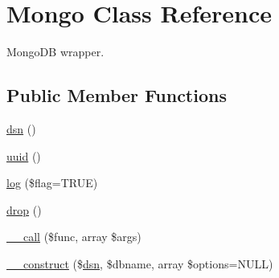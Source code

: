 \hypertarget{class_d_b_1_1_mongo}{}\section{Mongo Class Reference}
\label{class_d_b_1_1_mongo}


Mongo\+DB wrapper.  


\subsection*{Public Member Functions}
\begin{DoxyCompactItemize}
\item 
\hyperlink{class_d_b_1_1_mongo_af0196134b8f5405b3fe27fcceece0061}{dsn} ()
\item 
\hyperlink{class_d_b_1_1_mongo_a0a684acda95e124d8596758e4986fe44}{uuid} ()
\item 
\hyperlink{class_d_b_1_1_mongo_a92faa80a7077936bd630e5dcc7bb4a64}{log} (\$flag=T\+R\+UE)
\item 
\hyperlink{class_d_b_1_1_mongo_aeb639e5b2b713ed87ab8f2033af98ae8}{drop} ()
\item 
\hyperlink{class_d_b_1_1_mongo_a975d2c46a134129eb727fadcadf48adf}{\+\_\+\+\_\+call} (\$func, array \$args)
\item 
\hyperlink{class_d_b_1_1_mongo_ae0cc294ff45d4b98e4022efd3ae640d3}{\+\_\+\+\_\+construct} (\$\hyperlink{class_d_b_1_1_mongo_af0196134b8f5405b3fe27fcceece0061}{dsn}, \$dbname, array \$options=N\+U\+LL)
\end{DoxyCompactItemize}

